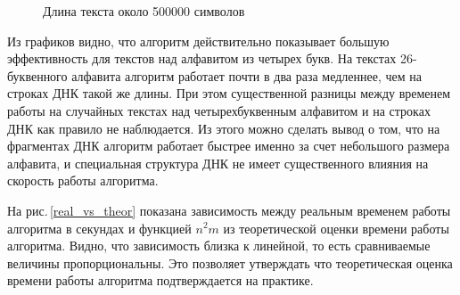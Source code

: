 \documentclass[14pt]{article}
\begin{document}
\begin{figure}[H]
    \begin{center}
    \end{center}
    \caption{Длина текста около 500000 символов}
    \label{dna_time_stats1}
\end{figure}

Из графиков видно, что алгоритм действительно показывает большую эффективность для текстов над алфавитом из четырех букв. На текстах 26-буквенного алфавита алгоритм работает почти в два раза медленнее, чем на строках ДНК такой же длины.
При этом существенной разницы между временем работы на случайных текстах над четырехбуквенным алфавитом и на строках ДНК как правило не наблюдается. Из этого можно сделать вывод о том, что на фрагментах ДНК алгоритм работает быстрее именно за счет
небольшого размера алфавита, и специальная структура ДНК не имеет существенного влияния на скорость работы алгоритма.

На рис.\,\ref{real_vs_theor} показана зависимость между реальным временем работы алгоритма в секундах и функцией $n^2m$ из теоретической оценки времени работы алгоритма. Видно, что зависимость близка к линейной, то есть сравниваемые величины пропорциональны. Это позволяет утверждать что теоретическая оценка времени работы алгоритма подтверждается на практике.
\end{document}
